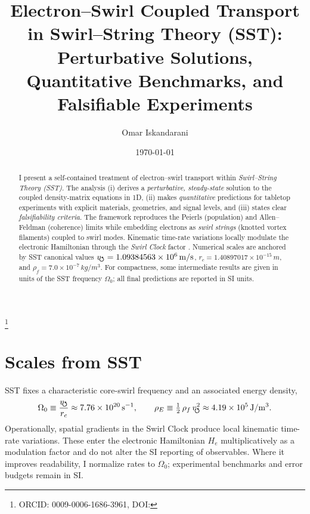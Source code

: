 \documentclass[aps,prb,preprint,amsmath,amssymb]{revtex4-2} %
\newcommand{\vswirlVal}{1.09384563\times10^{6}} %
\newcommand{\rcVal}{1.40897017\times10^{-15}} %
\newcommand{\rhoFVal}{7.0\times10^{-7}} %
\newcommand{\vswirl}{v_{\!\mkern-2mu\scriptstyle\boldsymbol{\circlearrowleft}}}
\newcommand{\rc}{r_c}
\newcommand{\rhoF}{\rho_{f}}
\newcommand{\rhoE}{\rho_{E}}
\begin{document}
    \title{Electron--Swirl Coupled Transport in Swirl--String Theory (SST):\\
    Perturbative Solutions, Quantitative Benchmarks, and Falsifiable Experiments}

    \author{Omar Iskandarani}
    \thanks{ORCID: 0009-0006-1686-3961, DOI: \paperdoi}
    \date{\today}

    \begin{abstract}
        I present a self-contained treatment of electron--swirl transport within \emph{Swirl--String Theory (SST)}. The analysis (i) derives a \emph{perturbative, steady-state} solution to the coupled density-matrix equations in 1D, (ii) makes \emph{quantitative} predictions for tabletop experiments with explicit materials, geometries, and signal levels, and (iii) states clear \emph{falsifiability criteria}. The framework reproduces the Peierls (population) and Allen--Feldman (coherence) limits \cite{Peierls1929,AllenFeldman1993,Simoncelli2019Unified} while embedding electrons as \emph{swirl strings} (knotted vortex filaments) coupled to swirl modes. Kinematic time-rate variations locally modulate the electronic Hamiltonian through the \emph{Swirl Clock} factor \cite{Madelung1927,Pati2000}. Numerical scales are anchored by SST canonical values $\vswirl=\vswirlVal\,\si{m/s}$, $\rc=\rcVal\,\si{m}$, and $\rhoF=\rhoFVal\,\si{kg/m^3}$. For compactness, some intermediate results are given in units of the SST frequency $\Omega_0$; all final predictions are reported in SI units.
    \end{abstract}

    \maketitle

    \section{Scales from SST}
        SST fixes a characteristic core-swirl frequency and an associated energy density,
        \begin{align}
            \Omega_0 \equiv \frac{\vswirl}{\rc} \approx 7.76\times10^{20}\,\si{s^{-1}},\qquad
            \rhoE \equiv \tfrac12\,\rhoF\,\vswirl^2 \approx 4.19\times10^{5}\,\si{J/m^3}.
        \end{align}
        Operationally, spatial gradients in the Swirl Clock produce local kinematic time-rate variations. These enter the electronic Hamiltonian $H_e$ multiplicatively as a modulation factor and do not alter the SI reporting of observables. Where it improves readability, I normalize rates to $\Omega_0$; experimental benchmarks and error budgets remain in SI.
\end{document}
